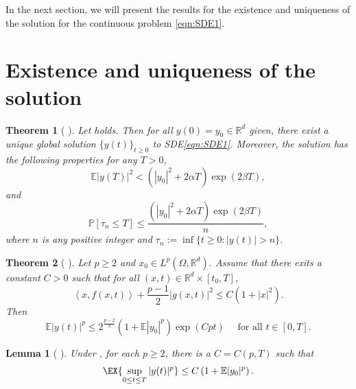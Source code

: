 \documentclass[sort&compress, preprint]{elsarticle}
\theoremstyle{definition}
\theoremstyle{plain}%
\newtheorem{thm}{Theorem}[section]
\newtheorem{lem}{Lemma}[section]
\theoremstyle{remark}
\newcommand{\ms}[1]{\mathbb{E}\left|#1\right|^2}
\newcommand{\mep}[1]{\mathbb{E}|#1|^p}
\newcommand{\m}[1]{\mathbb{E}#1}
\newcommand{\Prob}[1]{\mathbb{P}\left[#1\right]}
\newcommand{\innerprod}[2]{\left\langle#1, #2\right\rangle}
\begin{document}
In the next section, we will present the results for the existence and uniqueness of
the solution for the continuous problem \eqref{eqn:SDE1}.
%

\section{Existence and uniqueness of the solution} 

%
\begin{thm}[{
	 \cite[Thm. 2.2]{Mao2013}}]
	Let  holds. Then for all $y(0)=y_0\in \mathbb{R}^d$ given, there exist a 
	unique global solution $\{y(t)\}_{t\geq 0}$ to SDE\eqref{eqn:SDE1}. Moreover, the solution has the 
	following properties for any $T>0$,
	\begin{equation*}
		\ms{y(T)}< 
		\left(
			|y_0|^2 +2\alpha T 
		\right)\exp(2\beta T),
	\end{equation*}
	and
	\begin{equation*}
	\Prob{\tau_n\leq T}
	\leq \frac{
		\left(
		|y_0|^2 +2\alpha T 
		\right)
		\exp(2\beta T)
	}{n},
	\end{equation*}
	where $n$ is any positive integer and 
	$\tau_n := \inf \{ t\geq 0 : |y(t)|>n\}$.
\end{thm}
%
\begin{thm}[
		{\cite[Thm. 2.4.1]{Mao2007}}
	]
	\label{thm:MaoCoercive}
	Let $p\geq 2$ and $x_0\in L^p(\Omega, \mathbb{R}^d)$. Assume that there exits a constant $C>0$
	such that for all $(x,t)\in \mathbb{R}^d\times [t_0,T]$,
	\begin{equation*}
	\innerprod{x}{f(x,t)}+\frac{p-1}{2}|g(x,t)|^2 \leq C(1+|x|^2).
	\end{equation*}
	Then
	\begin{equation*}
	\m|y(t)|^p
	\leq
	2^{\frac{p-2}{2}}
	\left(
	1 + \m|y_0|^p
	\right)\exp({Cpt}) \quad \text{ for all } t\in[0,T].
	\end{equation*}
\end{thm}
%
\begin{lem}[
	{
		\cite[Lem 3.2]{Higham2002b}}
	]
	\label{lem:MomentBound}
	Under , for each $p\geq 2$, there is a $C=C(p,T)$ such that
	\begin{equation*}
	\EX{\sup_{0\leq t \leq T}|y(t)|^p}\leq C \left(1+\mep{y_0}\right).
	\end{equation*}
\end{lem}
%
\end{document}
